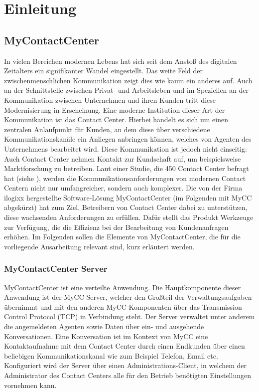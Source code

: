 \chapter{Einleitung}
\label{chap:Einleitung}

\section{MyContactCenter}
\label{sec:MyContactCenter}
In vielen Bereichen modernen Lebens hat sich seit dem Anstoß des digitalen Zeitalters ein signifikanter Wandel eingestellt. Das weite Feld  der zwischenmenschlichen Kommunikation zeigt dies wie kaum ein anderes auf. Auch an der Schnittstelle zwischen Privat- und Arbeitsleben und im Speziellen an der Kommunikation zwischen Unternehmen und ihren Kunden tritt diese Modernisierung in Erscheinung. Eine moderne Institution dieser Art der Kommunikation ist das Contact Center. Hierbei handelt es sich um einen zentralen Anlaufpunkt für Kunden, an dem diese über verschiedene Kommunikationskanäle ein Anliegen anbringen können, welches von Agenten des Unternehmens bearbeitet wird. Diese Kommunikation ist jedoch nicht einseitig: Auch Contact Center nehmen Kontakt zur Kundschaft auf, um beispielsweise Marktforschung zu betreiben. 
\newline
Laut einer Studie, die 450 Contact Center befragt hat (siehe \cite{Deloitte:17}), werden die Kommunikationsanforderungen von modernen Contact Centern nicht nur umfangreicher, sondern auch komplexer. Die von der Firma ilogixx hergestellte Software-Lösung MyContactCenter (im Folgenden mit MyCC abgekürzt) hat zum Ziel, Betreibern von Contact Center dabei zu unterstützen, diese wachsenden Anforderungen zu erfüllen. Dafür stellt das Produkt Werkzeuge zur Verfügung, die die Effizienz bei der Bearbeitung von Kundenanfragen erhöhen. Im Folgenden sollen die Elemente von MyContactCenter, die für die vorliegende Ausarbeitung relevant sind, kurz erläutert werden.

\subsection{MyContactCenter Server}
\label{subsec:MyContactCenterServer}
MyContactCenter ist eine verteilte Anwendung. Die Hauptkomponente dieser Anwendung ist der MyCC-Server, welcher den Großteil der Verwaltungsaufgaben übernimmt und mit den anderen MyCC-Komponenten über das Transmission Control Protocol (TCP) in Verbindung steht. Der Server verwaltet unter anderem die angemeldeten Agenten sowie Daten über ein- und ausgehende Konversationen. Eine Konversation ist im Kontext von MyCC eine Kontaktaufnahme mit dem Contact Center durch einen Endkunden über einen beliebigen Kommunikationskanal wie zum Beispiel Telefon, Email etc. Konfiguriert wird der Server über einen Administrations-Client, in welchem der Administrator des Contact Centers alle für den Betrieb benötigten Einstellungen vornehmen kann. 

